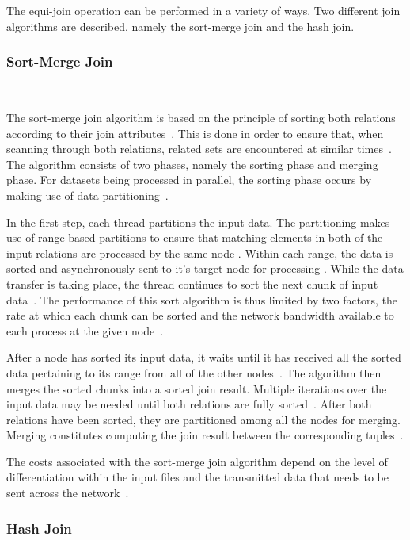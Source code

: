 \documentclass[10pt,twocolumn]{witseiepaper}
\begin{document}
The equi-join operation can be performed in a variety of ways. Two different join algorithms are described, namely the sort-merge join and the hash join.

\subsubsection{Sort-Merge Join}\label{sortmerge}$   $

The sort-merge join algorithm is based on the principle of sorting both relations according to their join attributes~\cite{thomas_zurek_optimisation_1997}. This is done in order to ensure that, when scanning through both relations, related sets are encountered at similar times~\cite{thomas_zurek_optimisation_1997}. The algorithm consists of two phases, namely the sorting phase and merging phase. For datasets being processed in parallel, the sorting phase occurs by making use of data partitioning~\cite{dist}.

In the first step, each thread partitions the input data. The partitioning makes use of range based partitions to ensure that matching elements in both of the input relations are processed by the same node \cite{dist}. Within each range, the data is sorted and asynchronously sent to it's target node for processing \cite{dist}. While the data transfer is taking place, the thread continues to sort the next chunk of input data~\cite{dist}. The performance of this sort algorithm is thus limited by two factors, the rate at which each chunk can be sorted and the network bandwidth available to each process at the given node~\cite{dist}.

After a node has sorted its input data, it waits until it has received all the sorted data pertaining to its range from all of the other nodes~\cite{dist}. The algorithm then merges the sorted chunks into a sorted join result. Multiple iterations over the input data may be needed until both relations are fully sorted~\cite{dist}. After both relations have been sorted, they are partitioned among all the nodes for merging. Merging constitutes computing the join result between the corresponding tuples~\cite{dist}.

The costs associated with the sort-merge join algorithm depend on the level of differentiation within the input files and the transmitted data that needs to be sent across the network~\cite{dist}.

\subsubsection{Hash Join}$    $
\end{document}
